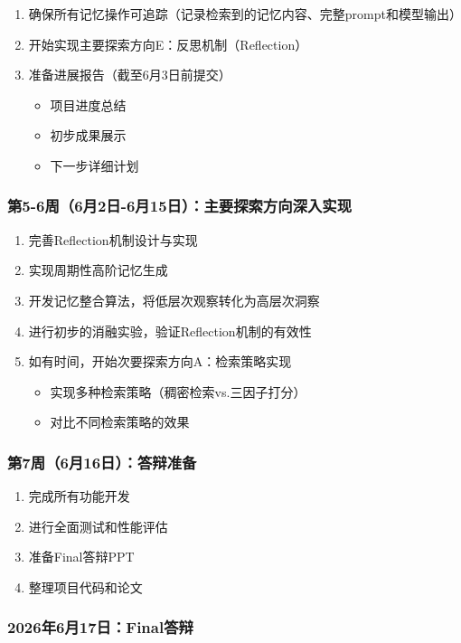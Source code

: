 \documentclass[11pt]{article}
\begin{document}
\begin{enumerate}
\item 确保所有记忆操作可追踪（记录检索到的记忆内容、完整prompt和模型输出）
\item 开始实现主要探索方向E：反思机制（Reflection）
\item 准备进展报告（截至6月3日前提交）
\begin{itemize}
\item 项目进度总结
\item 初步成果展示
\item 下一步详细计划
\end{itemize}
\end{enumerate}

\subsubsection{第5-6周（6月2日-6月15日）：主要探索方向深入实现}

\begin{enumerate}
\item 完善Reflection机制设计与实现
\item 实现周期性高阶记忆生成
\item 开发记忆整合算法，将低层次观察转化为高层次洞察
\item 进行初步的消融实验，验证Reflection机制的有效性
\item 如有时间，开始次要探索方向A：检索策略实现
\begin{itemize}
\item 实现多种检索策略（稠密检索vs.三因子打分）
\item 对比不同检索策略的效果
\end{itemize}
\end{enumerate}

\subsubsection{第7周（6月16日）：答辩准备}

\begin{enumerate}
\item 完成所有功能开发
\item 进行全面测试和性能评估
\item 准备Final答辩PPT
\item 整理项目代码和论文
\end{enumerate}

\subsubsection{2026年6月17日：Final答辩}
\end{document}
